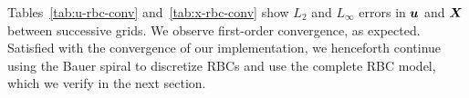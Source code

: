 Tables~\ref{tab:u-rbc-conv} and~\ref{tab:x-rbc-conv} show $L_2$ and
$L_\infty$ errors in $\boldsymbol{u}$ and $\boldsymbol{X}$ between successive grids. We observe first-order
convergence, as expected.  Satisfied with the convergence of our implementation, we
henceforth continue using the Bauer spiral to discretize RBCs and use the complete RBC
model, which we verify in the next section.

